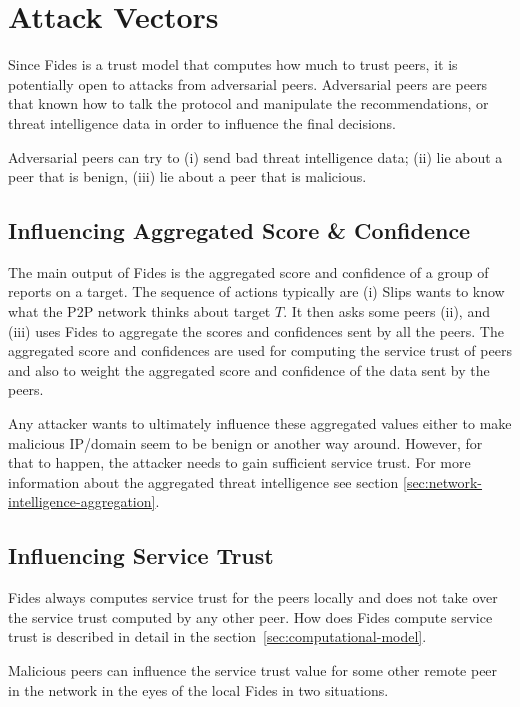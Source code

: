 \section{Attack Vectors}
\label{sec:attack-vectors}
Since Fides is a trust model that computes how much to trust peers, it is potentially open to attacks from adversarial peers. Adversarial peers are peers that known how to talk the protocol and manipulate the recommendations, or threat intelligence data in order to influence the final decisions.

Adversarial peers can try to (i) send bad threat intelligence data; (ii) lie about a peer that is benign, (iii) lie about a peer that is malicious.

\subsection{Influencing Aggregated Score \& Confidence}
\label{subsec:influencing-aggregated-score-confidence}
The main output of Fides is the aggregated score and confidence of a group of reports on a target. The sequence of actions typically are (i) Slips wants to know what the P2P network thinks about target $T$. It then asks some peers (ii), and (iii) uses Fides to aggregate the scores and confidences sent by all the peers. The aggregated score and confidences are used for computing the service trust of peers and also to weight the aggregated score and confidence of the data sent by the peers.

Any attacker wants to ultimately influence these aggregated values either to make malicious IP/domain seem to be benign or another way around.
However, for that to happen, the attacker needs to gain sufficient service trust.
For more information about the aggregated threat intelligence see section \ref{sec:network-intelligence-aggregation}.

\subsection{Influencing Service Trust}
\label{subsec:influencing-service-trust}
Fides always computes service trust for the peers locally and does not take over the service trust computed by any other peer.
How does Fides compute service trust is described in detail in the section~\ref{sec:computational-model}.

Malicious peers can influence the service trust value for some other remote peer in the network in the eyes of the local Fides in two situations.

